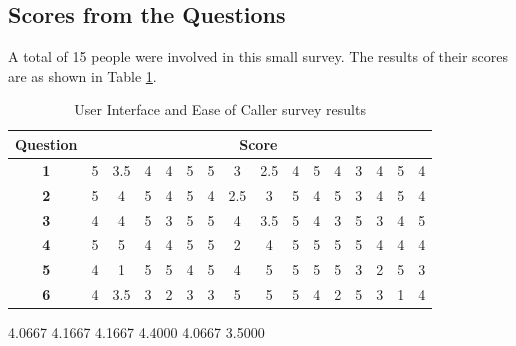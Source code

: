 \documentclass[main.tex]{subfiles}
\begin{document}
\subsection{Scores from the Questions}
A total of 15 people were involved in this small survey. The results of their scores are as shown in Table \ref{tbl:survey}.

\begin{table}[h]
\centering
\begin{tabular}{|c|ccccccccccccccc|}
	\hline
\textbf{Question} & \multicolumn{15}{|c|}{\textbf{Score}} \\\hline
\textbf{1} & 5 & 3.5 & 4 & 4 & 5 & 5 & 3 & 2.5 & 4 & 5 & 4 & 3 & 4 & 5 & 4 \\
\textbf{2} & 5 & 4 & 5 & 4 & 5 & 4 & 2.5 & 3 & 5 & 4 & 5 & 3 & 4 & 5 & 4 \\
\textbf{3} & 4 & 4 & 5 & 3 & 5 & 5 & 4 & 3.5 & 5 & 4 & 3 & 5 & 3 & 4 & 5 \\
\textbf{4} & 5 & 5 & 4 & 4 & 5 & 5 & 2 & 4 & 5 & 5 & 5 & 5 & 4 & 4 & 4 \\
\textbf{5} & 4 & 1 & 5 & 5 & 4 & 5 & 4 & 5 & 5 & 5 & 5 & 3 & 2 & 5 & 3 \\
\textbf{6} & 4 & 3.5 & 3 & 2 & 3 & 3 & 5 & 5 & 5 & 4 & 2 & 5 & 3 & 1 & 4\\\hline
\end{tabular}
\caption{User Interface and Ease of Caller survey results}
\label{tbl:survey}
\end{table}

4.0667    4.1667    4.1667    4.4000    4.0667    3.5000
\end{document}
